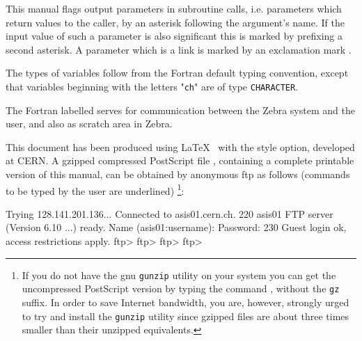 This manual flags output parameters in subroutine calls,
i.e. parameters which return values to the caller,
by an asterisk  following the argument's name.
If the input value of such a parameter is also significant
this is marked by prefixing a second asterisk.
A parameter which is a link is marked by an exclamation mark .

The types of variables follow from the Fortran default typing
convention, except that variables beginning with the letters
"{\tt ch}" are of type {\tt CHARACTER}. 

The Fortran labelled  serves
for communication between the Zebra system and the user,
and also as scratch area in Zebra.

This document has been produced using \LaTeX~\cite{bib-LATEX}
with the  style option, developed at CERN. 
A gzipped compressed PostScript file , 
containing a complete printable version
of this manual, can be obtained by anonymous ftp as follows
(commands to be typed by the user are underlined)%
\footnote{If you do not have the gnu {\tt gunzip} utility on your system
          you can get the uncompressed PostScript version by typing the
          command , without the {\tt gz} suffix. 
          In order to save Internet bandwidth, you are, however, strongly 
          urged to try and install the {\tt gunzip} utility since gzipped files 
          are about three times smaller than their unzipped equivalents.}:

\vspace*{3mm} 
\begin{XMP}
    Trying 128.141.201.136...
    Connected to asis01.cern.ch.
    220 asis01 FTP server (Version 6.10 ...) ready.
    Name (asis01:username): 
    Password: 
    230 Guest login ok, access restrictions apply.
    ftp> 
    ftp> 
    ftp> 
    ftp> 
\end{XMP}
\vspace*{3mm} 

\newpage

\tableofcontents
\listoffigures
\cleardoublepage


